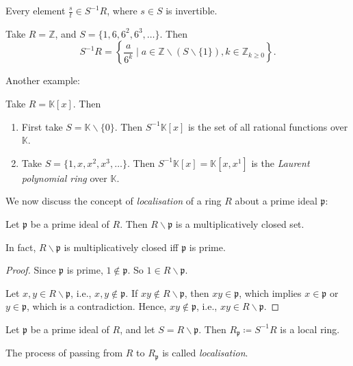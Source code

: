 \begin{remark}
    Every element \( \frac{s}{t} \in S^{-1}R \), where \( s \in S \) is invertible.
\end{remark}
\begin{example}
    Take \( R = \mathbb{Z} \), and \( S = \{1, 6, 6^2, 6^3, \ldots\} \). Then 
    \[
        S^{-1}R = \left\{\frac{a}{6^k} \mid a \in \mathbb{Z} \smallsetminus (S \smallsetminus \{1\}), k \in \mathbb{Z}_{k \ge 0}\right\}.
    \]
\end{example}
Another example:
\begin{example}
    Take \( R = \mathbb{K}[x] \). Then
     \begin{enumerate}
         \item First take \( S = \mathbb{K} \smallsetminus \{0\}\). Then \( S^{-1}\mathbb{K}[x] \) is the set of all rational functions over  \( \mathbb{K} \). 
         \item Take  \( S = \{1, x, x^2, x^3, \ldots\} \). Then \( S^{-1}\mathbb{K}[x] = \mathbb{K}[x, x^{1}] \) is the  \emph{Laurent polynomial ring} over \( \mathbb{K} \).
    \end{enumerate}
\end{example}
We now discuss the concept of \emph{localisation} of a ring  \(R\) about a prime ideal  \(\mathfrak{p}\):
\begin{lemma}
    Let \(\mathfrak{p}\) be a prime ideal of \(R\). Then  \(R \smallsetminus \mathfrak{p}\) is a multiplicatively closed set.

    In fact, \(R \smallsetminus \mathfrak{p}\) is multiplicatively closed iff \(\mathfrak{p}\) is prime.
\end{lemma}
\begin{proof}
   Since \(\mathfrak{p}\) is prime, \(1 \not\in \mathfrak{p}\). So \(1 \in R \smallsetminus \mathfrak{p}\).

   Let \(x, y \in R \smallsetminus \mathfrak{p}\), i.e., \(x,y \not\in \mathfrak{p}\). If \(xy \not\in R \smallsetminus \mathfrak{p}\), then \(xy \in \mathfrak{p}\), which implies \(x \in \mathfrak{p}\) or \(y \in \mathfrak{p}\), which is a contradiction. Hence, \(xy \not\in  \mathfrak{p}\), i.e., \(xy \in R \smallsetminus \mathfrak{p}\).
\end{proof}
\begin{theorem}[Localisation]
    Let \(\mathfrak{p}\) be a prime ideal of \(R\), and let \(S = R \smallsetminus \mathfrak{p}\). Then \(R_\mathfrak{p} \coloneq S^{-1}R\) is a local ring.

    The process of passing from \(R\) to  \(R_\mathfrak{p}\) is called \emph{localisation}.
\end{theorem}
